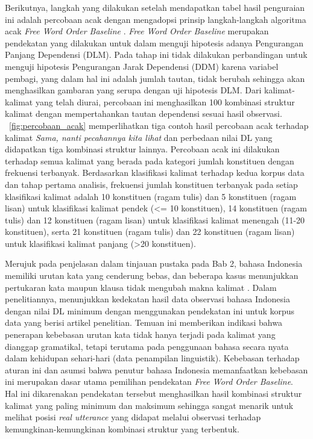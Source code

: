 Berikutnya, langkah yang dilakukan setelah mendapatkan tabel hasil penguraian ini adalah percobaan acak dengan mengadopsi prinsip langkah-langkah algoritma acak \textit{Free Word Order Baseline} \citep{futrell2015large}. \textit{Free Word Order Baseline} merupakan pendekatan yang dilakukan untuk \cite{futrell2015large} dalam menguji hipotesis adanya Pengurangan Panjang Dependensi (DLM). Pada tahap ini tidak dilakukan perbandingan untuk menguji hipotesis Pengurangan Jarak Dependensi (DDM) karena variabel pembagi, yang dalam hal ini adalah jumlah tautan, tidak berubah sehingga akan menghasilkan gambaran yang serupa dengan uji hipotesis DLM. Dari kalimat-kalimat yang telah diurai, percobaan ini menghasilkan 100 kombinasi struktur kalimat dengan mempertahankan tautan dependensi sesuai hasil observasi. \pic~\ref{fig:percobaan_acak} memperlihatkan tiga contoh hasil percobaan acak terhadap kalimat \textit{Sama, nanti pecahannya kita lihat} dan perbedaan nilai DL yang didapatkan tiga kombinasi struktur lainnya. Percobaan acak ini dilakukan terhadap semua kalimat yang berada pada kategori jumlah konstituen dengan frekuensi terbanyak. Berdasarkan klasifikasi kalimat terhadap kedua korpus data dan tahap pertama analisis, frekuensi jumlah konstituen terbanyak pada setiap klasifikasi kalimat adalah 10 konstituen (ragam tulis) dan 5 konstituen (ragam lisan) untuk klasifikasi kalimat pendek (\textless= 10 konstituen), 14 konstituen (ragam tulis) dan 12 konstituen (ragam lisan) untuk klasifikasi kalimat menengah (11-20 konstituen), serta 21 konstituen (ragam tulis) dan 22 konstituen (ragam lisan) untuk klasifikasi kalimat panjang (\textgreater 20 konstituen). 

Merujuk pada penjelasan dalam tinjauan pustaka pada Bab 2, bahasa Indonesia memiliki urutan kata yang cenderung bebas, dan beberapa kasus menunjukkan pertukaran kata maupun klausa tidak mengubah makna kalimat \citep{sneddon2010indonesian}. Dalam penelitiannya, \cite{futrell2015large} menunjukkan kedekatan hasil data observasi bahasa Indonesia dengan nilai DL minimum dengan menggunakan pendekatan ini untuk korpus data yang berisi artikel penelitian. Temuan ini memberikan indikasi bahwa penerapan kebebasan urutan kata tidak hanya terjadi pada kalimat yang dianggap gramatikal, tetapi terutama pada penggunaan bahasa secara nyata dalam kehidupan sehari-hari (data penampilan linguistik). Kebebasan terhadap aturan ini dan asumsi bahwa penutur bahasa Indonesia memanfaatkan kebebasan ini merupakan dasar utama pemilihan pendekatan \textit{Free Word Order Baseline}. Hal ini dikarenakan pendekatan tersebut menghasilkan hasil kombinasi struktur kalimat yang paling minimum dan maksimum sehingga sangat menarik untuk melihat posisi \textit{real utterance} yang didapat melalui observasi terhadap kemungkinan-kemungkinan kombinasi struktur yang terbentuk. 

